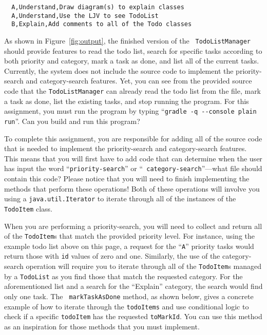 \documentclass[11pt]{article}
\newcommand{\command}[1]{``\lstinline{#1}''}
\begin{document}
\vspace{-0.05in}
\begin{verbatim}
  A,Understand,Draw diagram(s) to explain classes
  A,Understand,Use the LJV to see TodoList
  B,Explain,Add comments to all of the Todo classes
\end{verbatim}
\vspace{-0.05in}

As shown in Figure~\ref{fig:output}, the finished version of the {\tt
TodoListManager} should provide features to read the todo list, search for
specific tasks according to both priority and category, mark a task as done, and
list all of the current tasks. Currently, the system does not include the source
code to implement the priority-search and category-search features. Yet, you can
see from the provided source code that the {\tt TodoListManager} can already
read the todo list from the file, mark a task as done, list the existing tasks,
and stop running the program. For this assignment, you must run the program by
typing \command{gradle -q --console plain run}. Can you build and run this
program?

To complete this assignment, you are responsible for adding all of the source
code that is needed to implement the priority-search and category-search
features. This means that you will first have to add code that can determine
when the user has input the word ``{\tt priority-search}'' or ``{\tt
category-search}''---what file should contain this code? Please notice that you
will need to finish implementing the methods that perform these operations! Both
of these operations will involve you using a {\tt java.util.Iterator} to iterate
through all of the instances of the {\tt TodoItem} class.

When you are performing a priority-search, you will need to collect and return
all of the {\tt TodoItem}s that match the provided priority level. For instance,
using the example todo list above on this page, a request for the ``{\tt A}''
priority tasks would return those with {\tt id} values of zero and one.
Similarly, the use of the category-search operation will require you to iterate
through all of the {\tt TodoItem}s managed by a {\tt TodoList} as you find those
that match the requested category. For the aforementioned list and a search for
the ``Explain'' category, the search would find only one task. The {\tt
  markTaskAsDone} method, as shown below, gives a concrete example of how to
  iterate through the {\tt todoItems} and use conditional logic to check if a
  specific {\tt todoItem} has the requested {\tt toMarkId}. You can use this
  method as an inspiration for those methods that you must implement.
\end{document}
